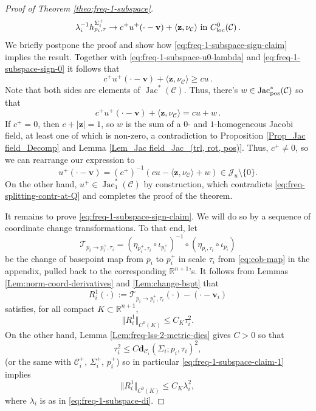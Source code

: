 \documentclass[11pt, letterpaper, reqno]{amsart}
\numberwithin{equation}{section}
\theoremstyle{remark}
\newcommand{\RR}{\mathbb{R}}
\newcommand{\cC}{\mathcal{C}}
\newcommand{\cJ}{\mathcal{J}}
\newcommand{\cT}{\mathcal{T}}
\newcommand{\mbfd}{\mathbf{d}}
\newcommand{\mbfv}{\mathbf{v}}
\newcommand{\mbfz}{\mathbf{z}}
\newcommand{\Jac}{\operatorname{Jac}}
\begin{document}
\begin{proof}[Proof of Theorem \ref{theo:freq-1-subspace}]
\begin{equation} \label{eq:freq-1-subspace-sign-claim}
	\lambda_i^{-1} h^{\Sigma^+_i}_{p_i, \tau} \to c^+ u^+(\cdot - \mbfv) + \langle \mbfz, \nu_\cC \rangle \text{ in } C^0_\textnormal{loc}(\cC) \, .
\end{equation}
We briefly postpone the proof and show how \eqref{eq:freq-1-subspace-sign-claim} implies the result. Together with \eqref{eq:freq-1-subspace-u0-lambda} and \eqref{eq:freq-1-subspace-sign-0} it follows that
\[ c^+ u^+(\cdot - \mbfv) + \langle \mbfz, \nu_\cC \rangle \geq c u \, . \]
Note that both sides are elements of $\Jac^*(\cC)$. Thus, there's $w \in \Jac^*_\textnormal{pos}(\cC)$ so that
\[
c^+ u^{+}(\cdot - \mbfv) + \langle \mbfz, \nu_\cC \rangle = c u + w \, .
\]
If $c^+ = 0$, then $c + |\mbfz| = 1$, so $w$ is the sum of a $0$- and $1$-homogeneous Jacobi field, at least one of which is non-zero, a contradiction to Proposition \ref{Prop_Jac field_Decomp} and Lemma \ref{Lem_Jac field_Jac_(trl, rot, pos)}. Thus, $c^+ \neq 0$, so we can rearrange our expression to
\[
u^{+}(\cdot - \mbfv) = (c^+)^{-1}(c u - \langle \mbfz ,\nu_\cC \rangle + w) \in \cJ_u \setminus \{0\}. 
\]
On the other hand, $u^{+} \in \Jac^*_1(\cC)$ by construction, which contradicts \eqref{eq:freq-splitting-contr-at-Q} and completes the proof of the theorem.

It remains to prove \eqref{eq:freq-1-subspace-sign-claim}. We will do so by a sequence of coordinate change transformations. To that end, let
\[ \cT_{p_i \to p_i^+, \tau_i} = (\eta_{p_i^+, \tau_i} \circ \iota_{p_i^+})^{-1} \circ (\eta_{p_i, \tau_i} \circ \iota_{p_i}) \]
be the change of basepoint map from $p_i$ to $p_i^+$ in scale $\tau_i$ from \eqref{eq:cob-map} in the appendix, pulled back to the corresponding $\RR^{n+1}$'s. It follows from Lemmas \ref{Lem:norm-coord-derivatives} and \ref{Lem:change-bspt} that
\[
	R^1_i(\cdot) := \cT_{p_i \to p_i^+, \tau_i}(\cdot) - (\cdot - \mbfv_i)
\]
satisfies, for all compact $K \subset \RR^{n+1}$,
\begin{equation} \label{eq:freq-1-subspace-claim-1}
	\Vert R^1_i \Vert_{C^0(K)} \leq C_K \tau_i^2.
\end{equation}
On the other hand, Lemma \ref{Lem:freq-lss-2-metric-dies} gives $C>0$ so that
\[
\tau_i^2 \leq C \mbfd_{\cC_i}(\Sigma_i;p_i,\tau_i)^2,
\]
(or the same with $\cC_i^+$, $\Sigma_i^+$, $p_i^+$) so in particular \eqref{eq:freq-1-subspace-claim-1} implies
\begin{equation} \label{eq:freq-1-subspace-claim-1-final}
	\Vert R^1_i \Vert_{C^0(K)} \leq C_K \lambda_i^2,
\end{equation}
where $\lambda_i$ is as in \eqref{eq:freq-1-subspace-di}.



\end{proof}
\end{document}
